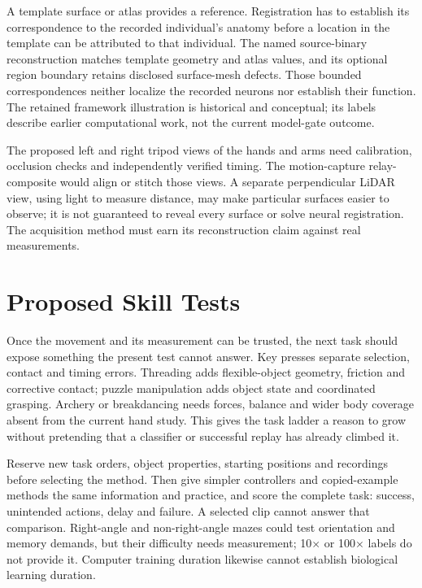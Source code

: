 A template surface or atlas provides a reference. Registration has to establish its correspondence to the recorded individual's anatomy before a location in the template can be attributed to that individual. The named source-binary reconstruction matches template geometry and atlas values, and its optional region boundary retains disclosed surface-mesh defects. Those bounded correspondences neither localize the recorded neurons nor establish their function. The retained framework illustration is historical and conceptual; its labels describe earlier computational work, not the current model-gate outcome.\par

The proposed left and right tripod views of the hands and arms need calibration, occlusion checks and independently verified timing. The motion-capture relay-composite would align or stitch those views. A separate perpendicular LiDAR view, using light to measure distance, may make particular surfaces easier to observe; it is not guaranteed to reveal every surface or solve neural registration. The acquisition method must earn its reconstruction claim against real measurements.\par

\section{Proposed Skill Tests}

Once the movement and its measurement can be trusted, the next task should expose something the present test cannot answer. Key presses separate selection, contact and timing errors. Threading adds flexible-object geometry, friction and corrective contact; puzzle manipulation adds object state and coordinated grasping. Archery or breakdancing needs forces, balance and wider body coverage absent from the current hand study. This gives the task ladder a reason to grow without pretending that a classifier or successful replay has already climbed it.\par

Reserve new task orders, object properties, starting positions and recordings before selecting the method. Then give simpler controllers and copied-example methods the same information and practice, and score the complete task: success, unintended actions, delay and failure. A selected clip cannot answer that comparison. Right-angle and non-right-angle mazes could test orientation and memory demands, but their difficulty needs measurement; 10\ensuremath{\times} or 100\ensuremath{\times} labels do not provide it. Computer training duration likewise cannot establish biological learning duration.\par

